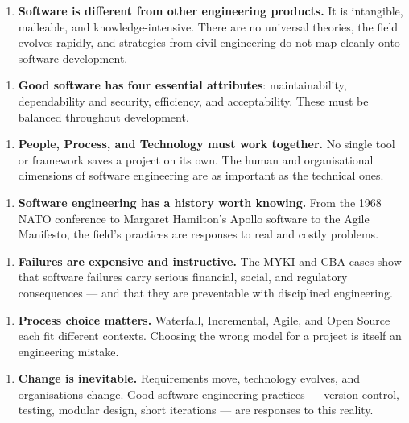 \documentclass[11pt,a4paper]{book}
\begin{document}
\begin{enumerate}
  \item \textbf{Software is different from other engineering products.} It is intangible, malleable, and knowledge-intensive. There are no universal theories, the field evolves rapidly, and strategies from civil engineering do not map cleanly onto software development.
\end{enumerate}

\begin{enumerate}
  \item \textbf{Good software has four essential attributes}: maintainability, dependability and security, efficiency, and acceptability. These must be balanced throughout development.
\end{enumerate}

\begin{enumerate}
  \item \textbf{People, Process, and Technology must work together.} No single tool or framework saves a project on its own. The human and organisational dimensions of software engineering are as important as the technical ones.
\end{enumerate}

\begin{enumerate}
  \item \textbf{Software engineering has a history worth knowing.} From the 1968 NATO conference to Margaret Hamilton's Apollo software to the Agile Manifesto, the field's practices are responses to real and costly problems.
\end{enumerate}

\begin{enumerate}
  \item \textbf{Failures are expensive and instructive.} The MYKI and CBA cases show that software failures carry serious financial, social, and regulatory consequences --- and that they are preventable with disciplined engineering.
\end{enumerate}

\begin{enumerate}
  \item \textbf{Process choice matters.} Waterfall, Incremental, Agile, and Open Source each fit different contexts. Choosing the wrong model for a project is itself an engineering mistake.
\end{enumerate}

\begin{enumerate}
  \item \textbf{Change is inevitable.} Requirements move, technology evolves, and organisations change. Good software engineering practices --- version control, testing, modular design, short iterations --- are responses to this reality.
\end{enumerate}
\end{document}
